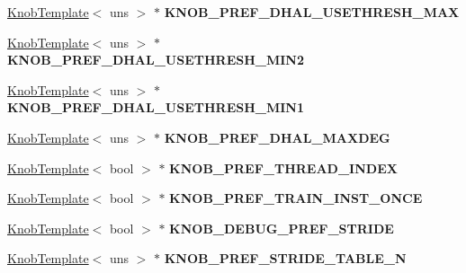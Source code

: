 \begin{DoxyCompactItemize}
\item 
\hypertarget{classall__knobs__c_a8288dd27fd60fd01a14cbdffc9f33b32}{
\hyperlink{classKnobTemplate}{KnobTemplate}$<$ uns $>$ $\ast$ {\bfseries KNOB\_\-PREF\_\-DHAL\_\-USETHRESH\_\-MAX}}
\label{classall__knobs__c_a8288dd27fd60fd01a14cbdffc9f33b32}

\item 
\hypertarget{classall__knobs__c_aab167a9aa50e39f662301d669bae5388}{
\hyperlink{classKnobTemplate}{KnobTemplate}$<$ uns $>$ $\ast$ {\bfseries KNOB\_\-PREF\_\-DHAL\_\-USETHRESH\_\-MIN2}}
\label{classall__knobs__c_aab167a9aa50e39f662301d669bae5388}

\item 
\hypertarget{classall__knobs__c_ae67631a0790c6c49ea91c940d638e919}{
\hyperlink{classKnobTemplate}{KnobTemplate}$<$ uns $>$ $\ast$ {\bfseries KNOB\_\-PREF\_\-DHAL\_\-USETHRESH\_\-MIN1}}
\label{classall__knobs__c_ae67631a0790c6c49ea91c940d638e919}

\item 
\hypertarget{classall__knobs__c_a04c26ccadfa3e7ef95b0b60a0636e1f7}{
\hyperlink{classKnobTemplate}{KnobTemplate}$<$ uns $>$ $\ast$ {\bfseries KNOB\_\-PREF\_\-DHAL\_\-MAXDEG}}
\label{classall__knobs__c_a04c26ccadfa3e7ef95b0b60a0636e1f7}

\item 
\hypertarget{classall__knobs__c_af5ffa49d976013dbcefabeb55cd69eb4}{
\hyperlink{classKnobTemplate}{KnobTemplate}$<$ bool $>$ $\ast$ {\bfseries KNOB\_\-PREF\_\-THREAD\_\-INDEX}}
\label{classall__knobs__c_af5ffa49d976013dbcefabeb55cd69eb4}

\item 
\hypertarget{classall__knobs__c_ac634ea9e9bdc9db4bbe6a5d3223432d3}{
\hyperlink{classKnobTemplate}{KnobTemplate}$<$ bool $>$ $\ast$ {\bfseries KNOB\_\-PREF\_\-TRAIN\_\-INST\_\-ONCE}}
\label{classall__knobs__c_ac634ea9e9bdc9db4bbe6a5d3223432d3}

\item 
\hypertarget{classall__knobs__c_a04b0ff05e06f792edf2f5306ac23182d}{
\hyperlink{classKnobTemplate}{KnobTemplate}$<$ bool $>$ $\ast$ {\bfseries KNOB\_\-DEBUG\_\-PREF\_\-STRIDE}}
\label{classall__knobs__c_a04b0ff05e06f792edf2f5306ac23182d}

\item 
\hypertarget{classall__knobs__c_aa223ed50c854580ae9b7c865ca3be7c0}{
\hyperlink{classKnobTemplate}{KnobTemplate}$<$ uns $>$ $\ast$ {\bfseries KNOB\_\-PREF\_\-STRIDE\_\-TABLE\_\-N}}
\label{classall__knobs__c_aa223ed50c854580ae9b7c865ca3be7c0}


\end{DoxyCompactItemize}
